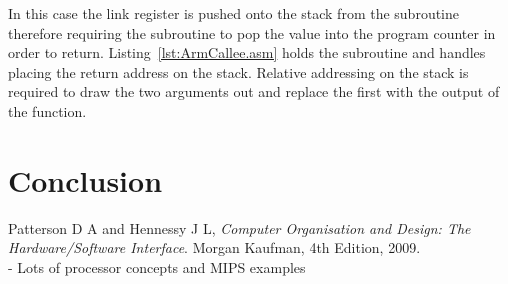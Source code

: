 \documentclass[12pt,a4paper]{article}
\begin{document}
In this case the link register is pushed onto the stack from the subroutine therefore requiring the subroutine to pop the value into the program counter in order to return.
Listing~\ref{lst:ArmCallee.asm} holds the subroutine and handles placing the return address on the stack.
Relative addressing on the stack is required to draw the two arguments out and replace the first with the output of the function.







\section{Conclusion}






\renewcommand{\refname}{Bibliography}
\begin{thebibliography}{9}

  Patterson D A and Hennessy J L,
  \emph{Computer Organisation and Design: The Hardware/Software Interface}.
  Morgan Kaufman,
  4th Edition,
  2009.\\
  - Lots of processor concepts and MIPS examples

\end{thebibliography}
\end{document}

